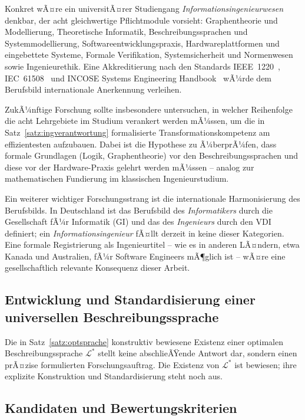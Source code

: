 ﻿\documentclass[a4paper,12pt]{report}
\theoremstyle{definition}
\begin{document}
Konkret wÃ¤re ein universitÃ¤rer Studiengang \emph{Informationsingenieurwesen} denkbar,
der acht gleichwertige Pflichtmodule vorsieht: Graphentheorie und Modellierung,
Theoretische Informatik, Beschreibungssprachen und Systemmodellierung,
Softwareentwicklungspraxis, Hardwareplattformen und eingebettete Systeme,
Formale Verifikation, Systemsicherheit und Normenwesen sowie Ingenieurethik.
Eine Akkreditierung nach den Standards IEEE~1220~\cite{ieee2021}, IEC~61508~\cite{iec61508}
und INCOSE Systems Engineering Handbook~\cite{incose2015} wÃ¼rde dem Berufsbild
internationale Anerkennung verleihen.

ZukÃ¼nftige Forschung sollte insbesondere untersuchen, in welcher Reihenfolge die acht
Lehrgebiete im Studium verankert werden mÃ¼ssen, um die in Satz~\ref{satz:ingverantwortung}
formalisierte Transformationskompetenz am effizientesten aufzubauen. Dabei ist die
Hypothese zu Ã¼berprÃ¼fen, dass formale Grundlagen (Logik, Graphentheorie) vor den
Beschreibungssprachen und diese vor der Hardware-Praxis gelehrt werden mÃ¼ssen --
analog zur mathematischen Fundierung im klassischen Ingenieurstudium.

Ein weiterer wichtiger Forschungsstrang ist die internationale Harmonisierung des
Berufsbilds. In Deutschland ist das Berufsbild des \emph{Informatikers} durch die
Gesellschaft fÃ¼r Informatik (GI) und das des \emph{Ingenieurs} durch den VDI
definiert; ein \emph{Informationsingenieur} fÃ¤llt derzeit in keine dieser Kategorien.
Eine formale Registrierung als Ingenieurtitel -- wie es in anderen LÃ¤ndern, etwa
Kanada und Australien, fÃ¼r Software Engineers mÃ¶glich ist -- wÃ¤re eine gesellschaftlich
relevante Konsequenz dieser Arbeit.

\subsection{Entwicklung und Standardisierung einer universellen Beschreibungssprache}

Die in Satz~\ref{satz:optsprache} konstruktiv bewiesene Existenz einer optimalen
Beschreibungssprache $\mathcal{L}^*$ stellt keine abschlieÃŸende Antwort dar, sondern
einen prÃ¤zise formulierten Forschungsauftrag. Die Existenz von $\mathcal{L}^*$ ist
bewiesen; ihre explizite Konstruktion und Standardisierung steht noch aus.

\subsection{Kandidaten und Bewertungskriterien}
\end{document}
